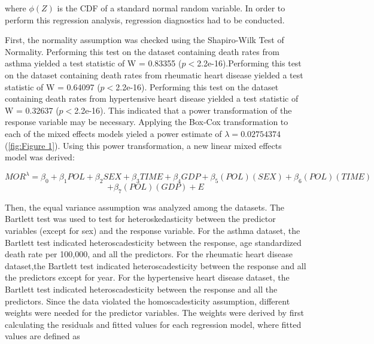 \documentclass[12pt, letterpaper, twoside]{article}
\begin{document}
where \begin{math}\phi(Z)\end{math} is the CDF of a standard normal random
variable. In order to perform this regression analysis, regression diagnostics
had to be conducted.\par

First, the normality assumption was checked using the
Shapiro-Wilk Test of Normality. Performing this test on the dataset containing
death rates from asthma yielded a test statistic of W = 0.83355
(\begin{math}p<\end{math}2.2e-16).Performing this test on the dataset containing
death rates from rheumatic heart disease yielded a test statistic of W = 0.64097
(\begin{math}p<\end{math}2.2e-16). Performing this test on the dataset containing
death rates from hypertensive heart disease yielded a test statistic of
W = 0.32637 (\begin{math}p<\end{math}2.2e-16). This indicated that a power
transformation of the response variable may be necessary. Applying the Box-Cox
transformation to each of the mixed effects models yieled a power estimate of
\begin{math}\lambda=0.02754374\end{math} (\autoref{fig:Figure 1}). Using this
power transformation, a new linear mixed effects model was derived:

\[
  MOR^{\lambda} = \beta_{0} + \beta_{1}POL + \beta_{2}SEX + \beta_{3}TIME +\beta_{4}GDP
  + \beta_{5}(POL)(SEX) + \beta_{6}(POL)(TIME)
\]
\[
 + \beta_{7}(POL)(GDP) + E
\]

\par Then, the equal variance assumption was analyzed among the datasets. The
Bartlett test was used to test for heteroskedasticity between the predictor
variables (except for sex) and the response variable. For the asthma dataset,
the Bartlett test indicated heteroscadesticity between the response, age
standardized death rate per 100,000, and all the predictors. For the rheumatic
heart disease dataset,the Bartlett test indicated heteroscadesticity between the
response and all the predictors except for year. For the hypertensive heart
disease dataset, the Bartlett test indicated heteroscadesticity between the
response and all the predictors. Since the data violated the homoscadesticity
assumption, different weights were needed for the predictor variables. The weights
were derived by first calculating the residuals and fitted values for each regression
model, where fitted values are defined as
\end{document}
